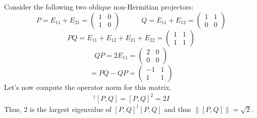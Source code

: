 \begin{example}
    Consider the following two oblique non-Hermitian projectors:
    \begin{equation}
        P = E_{11} + E_{21} = \begin{pmatrix}
            1 & 0 \\1 & 0
        \end{pmatrix}\quad\quad\quad Q = E_{11} + E_{12} = \begin{pmatrix}
            1 & 1\\0 &0
        \end{pmatrix}
    \end{equation}
    \begin{equation}
        PQ = E_{11} + E_{12} + E_{21} + E_{22} = \begin{pmatrix}
            1 & 1\\
            1 & 1
        \end{pmatrix}
    \end{equation}
    \begin{equation}
        QP = 2E_{11} = \begin{pmatrix}
            2 & 0\\0 & 0
        \end{pmatrix}
    \end{equation}
    \begin{equation}
        [P,Q] = PQ - QP = \begin{pmatrix}
            -1 & 1\\ 1 & 1
        \end{pmatrix}
    \end{equation}
Let's now compute the operator norm for this matrix.
\begin{align*}
    [P,Q]^\dagger[P,Q] = [P,Q]^2= 2I
\end{align*}
\noindent Thus, $2$ is the largest eigenvalue of $[P,Q]^\dagger[P,Q]$ and thus $\|[P,Q]\| = \sqrt{2}$.


\end{example}
